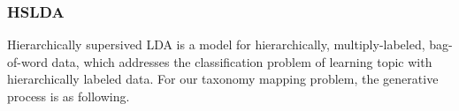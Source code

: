 


\subsubsection{HSLDA}

Hierarchically supersived LDA \cite{perotte2011hierarchically} is a model for 
hierarchically, multiply-labeled, bag-of-word data, which addresses the classification 
problem of learning topic with hierarchically labeled data. For our taxonomy mapping 
problem, the generative process is as following.


